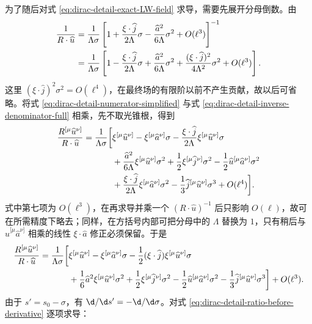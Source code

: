 为了随后对式 \eqref{eq:dirac-detail-exact-LW-field} 求导，需要先展开分母倒数。由
\begin{align}
 {1\over R\cdot \widehat u}
 &={1\over\Lambda\sigma}
 \left[
 1+{\xi\cdot \widehat j\over2\Lambda}\sigma
 -{\widehat a^2\over6\Lambda}\sigma^2
 +O(\ell^3)
 \right]^{-1}
 \notag\\
 &={1\over\Lambda\sigma}
 \left[
 1-{\xi\cdot \widehat j\over2\Lambda}\sigma
 +{\widehat a^2\over6\Lambda}\sigma^2
 +{(\xi\cdot \widehat j)^2\over4\Lambda^2}\sigma^2
 +O(\ell^3)
 \right].
 \label{eq:dirac-detail-inverse-denominator-full}
\end{align}
这里 $(\xi\cdot \widehat j)^2\sigma^2=O(\ell^4)$，在最终场的有限阶以前不产生贡献，故以后可省略。将式 \eqref{eq:dirac-detail-numerator-simplified} 与式 \eqref{eq:dirac-detail-inverse-denominator-full} 相乘，先不取光锥根，得到
\begin{align}
 {R^{[\mu}\widehat u^{\nu]}\over R\cdot \widehat u}
 ={1\over\Lambda\sigma}\bigg[{}
 &\xi^{[\mu}\widehat u^{\nu]}
 -\xi^{[\mu}\widehat a^{\nu]}\sigma
 -{\xi\cdot \widehat j\over2\Lambda}
 \xi^{[\mu}\widehat u^{\nu]}\sigma
 \notag\\
 &+{\widehat a^2\over6\Lambda}
 \xi^{[\mu}\widehat u^{\nu]}\sigma^2
 +{1\over2}\xi^{[\mu}\widehat j^{\nu]}\sigma^2
 -{1\over2}\widehat u^{[\mu}\widehat a^{\nu]}\sigma^2
 \notag\\
 &+{\xi\cdot \widehat j\over2\Lambda}
 \xi^{[\mu}\widehat a^{\nu]}\sigma^2
 -{1\over3}\widehat j^{[\mu}\widehat u^{\nu]}\sigma^3
 +O(\ell^4)
 \bigg].
 \label{eq:dirac-detail-ratio-before-derivative-full}
\end{align}
式中第七项为 $O(\ell^3)$，在再求导并乘一个 $(R\cdot \widehat u)^{-1}$ 后只影响 $O(\ell)$，故可在所需精度下略去；同样，在方括号内部可把分母中的 $\Lambda$ 替换为 $1$，只有稍后与 $\widehat u^{[\mu}\widehat a^{\nu]}$ 相乘的线性 $\xi\cdot \widehat a$ 修正必须保留。于是
\begin{align}
 {R^{[\mu}\widehat u^{\nu]}\over R\cdot \widehat u}
 ={1\over\Lambda\sigma}\bigg[{}
 &\xi^{[\mu}\widehat u^{\nu]}
 -\xi^{[\mu}\widehat a^{\nu]}\sigma
 -{1\over2}(\xi\cdot \widehat j)
 \xi^{[\mu}\widehat u^{\nu]}\sigma
 \notag\\
 &+{1\over6}\widehat a^2\xi^{[\mu}\widehat u^{\nu]}\sigma^2
 +{1\over2}\xi^{[\mu}\widehat j^{\nu]}\sigma^2
 -{1\over2}\widehat u^{[\mu}\widehat a^{\nu]}\sigma^2
 -{1\over3}\widehat j^{[\mu}\widehat u^{\nu]}\sigma^3
 \bigg]+O(\ell^3).
 \label{eq:dirac-detail-ratio-before-derivative}
\end{align}
由于 $s'=s_0-\sigma$，有 $\d/\d s'=-\d/\d\sigma$。对式 \eqref{eq:dirac-detail-ratio-before-derivative} 逐项求导：
